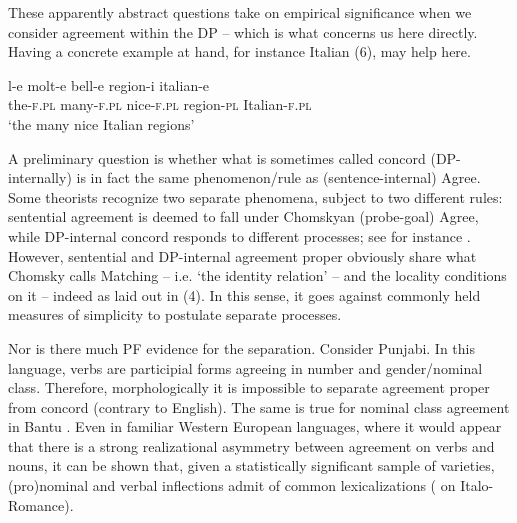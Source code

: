\documentclass[output=paper]{langsci/langscibook}
\begin{document}
These apparently abstract questions take on empirical significance when we consider agreement within the DP – which is what concerns us here directly. Having a concrete example at hand, for instance Italian (6), may help here. 

\ea%
    \label{ex:manzini:6}
    \gll l-e    molt-e   bell-e    region-i  italian-e\\
         the-\textsc{f.pl}   many-\textsc{f.pl}   nice-\textsc{f.pl}   region-\textsc{pl}    Italian-\textsc{f.pl} \\
    \glt ‘the many nice Italian regions’
\z

A preliminary question is whether what is sometimes called concord (DP-internally) is in fact the same phenomenon/rule as (sentence-internal) Agree. Some theorists recognize two separate phenomena, subject to two different rules: sentential agreement is deemed to fall under Chomskyan (probe-goal) Agree, while DP-internal concord responds to different processes; see for instance \citet{Giusti2008}. However, sentential and DP-internal agreement proper obviously share what Chomsky calls Matching – i.e. ‘the identity relation’ – and the locality conditions on it – indeed as laid out in (4). In this sense, it goes against commonly held measures of simplicity to postulate separate processes. 

Nor is there much PF evidence for the separation. Consider Punjabi. In this language, verbs are participial forms agreeing in number and gender/nominal class. Therefore, morphologically it is impossible to separate agreement proper from concord (contrary to English). The same is true for nominal class agreement in Bantu \citep{Baker2008}. Even in familiar Western European languages, where it would appear that there is a strong realizational asymmetry between agreement on verbs and nouns, it can be shown that, given a statistically significant sample of varieties, (pro)nominal and verbal inflections admit of common lexicalizations (\citealt{Manzini2007} on Italo-Romance).
\end{document}

